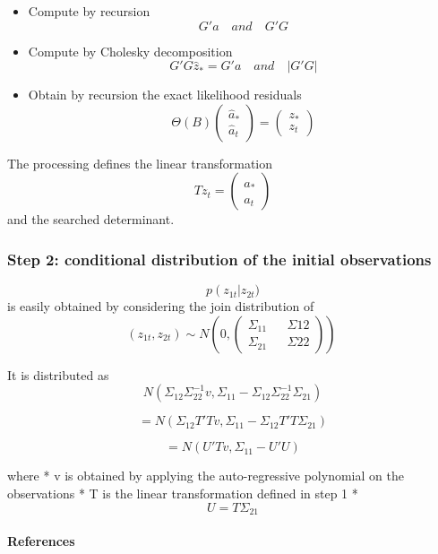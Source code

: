 \documentclass[
]{book}
\begin{document}
\begin{itemize}
\item
  Compute by recursion
  \[ G'a \quad and \quad G'G \]
\item
  Compute by Cholesky decomposition
  \[ G'G \hat z_* = G'a \quad and \quad |G'G| \]
\item
  Obtain by recursion the exact likelihood residuals
  \[ \Theta\left(B\right)\begin{pmatrix}\hat a_* \\ \hat a_t \end{pmatrix}  = \begin{pmatrix}z_* \\ z_t \end{pmatrix} \]
\end{itemize}

The processing defines the linear transformation
\[ T z_t = \begin{pmatrix}\hat a_* \\ \hat a_t \end{pmatrix} \] and the searched determinant.

\hypertarget{step-2-conditional-distribution-of-the-initial-observations}{%
\subsubsection{Step 2: conditional distribution of the initial observations}\label{step-2-conditional-distribution-of-the-initial-observations}}

\[ p\left(z_{1t}\right | z_{2t} ) \]
is easily obtained by considering the join distribution of
\[ \left( z_{1t}, z_{2t} \right) \sim N \left( 0, \begin{pmatrix} \Sigma_{11} && \Sigma{12} \\ \Sigma_{21} && \Sigma{22} \end{pmatrix}\right) \ \]

It is distributed as
\[ N\left( \Sigma_{12} \Sigma_{22}^{-1}v, \Sigma_{11}-\Sigma_{12} \Sigma_{22}^{-1} \Sigma_{21} \right)\]

\[= N\left( \Sigma_{12} T'Tv, \Sigma_{11}-\Sigma_{12} T'T\Sigma_{21} \right)\]

\[  = N\left( U'Tv, \Sigma_{11}-U'U \right)\]

where
* v is obtained by applying the auto-regressive polynomial on the observations
* T is the linear transformation defined in step 1
*
\[ U = T \Sigma_{21} \]

\hypertarget{references}{%
\paragraph{References}\label{references}}
\end{document}
